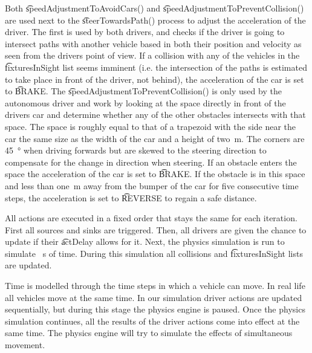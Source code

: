 Both \t{speedAdjustmentToAvoidCars()} and \t{speedAdjustmentToPreventCollision()} are used next to the \t{steerTowardsPath()} process to adjust the acceleration of the driver. The first is used by both drivers, and checks if the driver is going to intersect paths with another vehicle based in both their position and velocity as seen from the drivers point of view. If a collision with any of the vehicles in the \t{fixturesInSight} list seems imminent (i.e. the intersection of the paths is estimated to take place in front of the driver, not behind), the acceleration of the car is set to \t{BRAKE}.
The \t{speedAdjustmentToPreventCollision()} is only used by the autonomous driver and work by looking at the space directly in front of the drivers car and determine whether any of the other obstacles intersects with that space. The space is roughly equal to that of a trapezoid with the side near the car the same size as the width of the car and a height of \si{two \meter}. The corners are \si{45 \degree} when driving forwards but are skewed to the steering direction to compensate for the change in direction when steering. If an obstacle enters the space the acceleration of the car is set to \t{BRAKE}. If the obstacle is in this space and less than \si{one \meter} away from the bumper of the car for five consecutive time steps, the acceleration is set to \t{REVERSE} to regain a safe distance.

All actions are executed in a fixed order that stays the same for each iteration. First all sources and sinks are triggered. Then, all drivers are given the chance to update if their \t{actDelay} allows for it. Next, the physics simulation is run to simulate \si{ \second} of time. During this simulation all collisions and \t{fixturesInSight} lists are updated.

Time is modelled through the time steps in which a vehicle can move. In real life all vehicles move at the same time. In our simulation driver actions are updated sequentially, but during this stage the physics engine is paused. Once the physics simulation continues, all the results of the driver actions come into effect at the same time. The physics engine will try to simulate the effects of simultaneous movement.